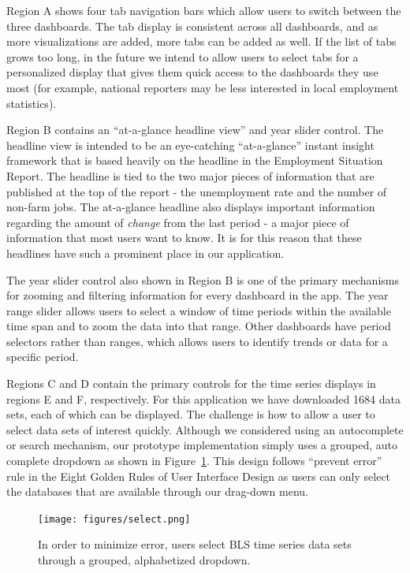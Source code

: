\documentclass{sigchi}
\begin{document}
Region A shows four tab navigation bars which allow users to switch between the three dashboards. The tab display is consistent across all dashboards, and as more visualizations are added, more tabs can be added as well. If the list of tabs grows too long, in the future we intend to allow users to select tabs for a personalized display that gives them quick access to the dashboards they use most (for example, national reporters may be less interested in local employment statistics).

Region B contains an ``at-a-glance headline view'' and year slider control. The headline view is intended to be an eye-catching ``at-a-glance'' instant insight framework that is based heavily on the headline in the Employment Situation Report. The headline is tied to the two major pieces of information that are published at the top of the report - the unemployment rate and the number of non-farm jobs. The at-a-glance headline also displays important information regarding the amount of \textit{change} from the last period - a major piece of information that most users want to know. It is for this reason that these headlines have such a prominent place in our application.

The year slider control also shown in Region B is one of the primary mechanisms for zooming and filtering information for every dashboard in the app. The year range slider allows users to select a window of time periods within the available time span and to zoom the data into that range. Other dashboards have period selectors rather than ranges, which allows users to identify trends or data for a specific period.

Regions C and D contain the primary controls for the time series displays in regions E and F, respectively. For this application we have downloaded 1684 data sets, each of which can be displayed. The challenge is how to allow a user to select data sets of interest quickly. Although we considered using an autocomplete or search mechanism, our prototype implementation simply uses a grouped, auto complete dropdown as shown in Figure~\ref{fig:select}. This design follows ``prevent error'' rule in the Eight Golden Rules of User Interface Design \cite{shneiderman_eight_????} as users can only select the databases that are available through our drag-down menu.

\begin{figure}[h]
    \centering
    \texttt{[image: figures/select.png]}
    \caption{In order to minimize error, users select BLS time series data sets through a grouped, alphabetized dropdown.}
    \label{fig:select}
\end{figure}
\end{document}
